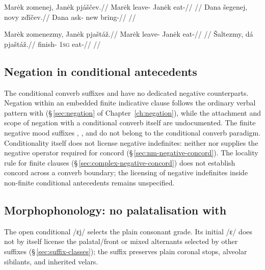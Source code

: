 \pex \label{ex:cond-open}
\a
\begingl
\gla Marėk zomenej, Janėk pjáščev.//
\glb Marėk leave-\Cond{} Janėk eat-\Irr{}//
\glft {} //
\endgl
\a
\begingl
\gla Dana šegenej, novy zďíčev.//
\glb Dana ask-\Cond{} new bring-\Irr{}//
\glft {} //
\endgl
\xe

\pex \label{ex:cond-expected}
\a
\begingl
\gla Marėk zomenezmy, Janėk pjaštáž.//
\glb Marėk leave-\ECond{} Janėk eat-\Ctpl{}//
\glft {} //
\endgl
\a
\begingl
\gla Šaltezmy, dá pjaštáž.//
\glb finish-\ECond{} \textsc{1sg} eat-\Ctpl{}//
\glft {} //
\endgl
\xe

\subsection{Negation in conditional antecedents}\label{sec:cond-negation}

The conditional converb suffixes  and  have no dedicated
negative counterparts. Negation within an embedded finite indicative clause
follows the ordinary verbal pattern with 
(§\,\ref{sec:negation} of Chapter~\ref{ch:negation}), while the attachment and
scope of negation with a conditional converb itself are undocumented. The
finite negative mood suffixes , , and  do not belong
to the conditional converb paradigm. Conditionality itself does not license
negative indefinites: neither  nor  supplies the
negative operator required for concord (§\,\ref{sec:nm-negative-concord}).
The locality rule for finite clauses (§\,\ref{sec:complex-negative-concord})
does not establish concord across a converb boundary; the licensing of
negative indefinites inside non-finite conditional antecedents remains
unspecified.

\subsection{Morphophonology: no palatalisation with }\label{sec:cond-nopala}

The open conditional  /ɛj/ selects the plain consonant grade.
Its initial /ɛ/ does not by itself license the palatal/front or mixed
alternants selected by other suffixes (§\,\ref{sec:suffix-classes});
the suffix preserves plain coronal stops, alveolar sibilants, and
inherited velars.

